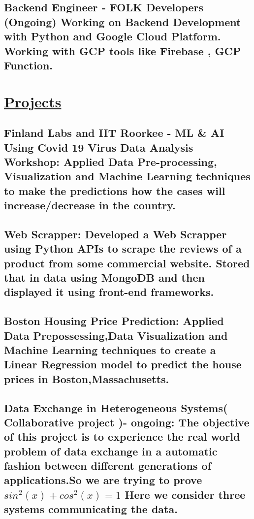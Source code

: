 \documentclass{article}
\begin{document}
    \subsection{\textbf{Backend Engineer}
    \textmd{- FOLK Developers (Ongoing)}\newline 
    \textmd{Working on Backend Development with Python and Google Cloud Platform. Working with GCP tools like Firebase , GCP  Function. } }
    
\section{\underline{Projects}}

    \subsection{\textbf{Finland Labs and IIT Roorkee - ML \& AI Using Covid 19 Virus Data Analysis Workshop:}
    \textmd{Applied Data Pre-processing, Visualization and Machine Learning techniques to make the predictions how the cases will increase/decrease in the country. } }

    \subsection{\textbf{Web Scrapper:}
    \textmd{Developed a Web Scrapper using Python APIs to scrape the reviews of a product from some commercial website.
    Stored that in data using MongoDB and then displayed it using front-end frameworks.}}

    \subsection{\textbf{Boston Housing Price Prediction:}
    \textmd{Applied Data Prepossessing,Data Visualization and Machine Learning techniques to create a 
    Linear Regression model to predict the house prices in Boston,Massachusetts. } }

    \subsection{\textbf{Data Exchange in Heterogeneous Systems( Collaborative project )- ongoing:}
    \textmd{The objective of this project is to experience the real
    world problem of data exchange in a automatic fashion between different generations 
    of applications.So we are trying to prove $sin^2(x) + cos^2(x)=1$ } 
    \textmd{Here we consider three systems communicating the data.}
    }
\end{document}
